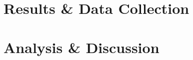 \documentclass{article}
\begin{document}
\newpage
\tableofcontents
\newpage


\section{Results \& Data Collection}

\section{Analysis \& Discussion}
\end{document}
